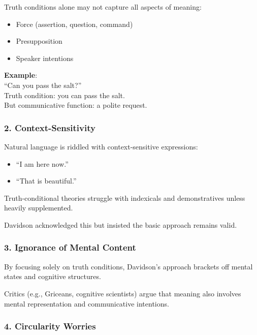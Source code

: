\documentclass[12pt]{article}
\newcommand{\tightlist}{\itemsep 0pt\parskip 0pt\parsep 0pt}
\begin{document}
Truth conditions alone may not capture all aspects of meaning:

\begin{itemize}
\tightlist
\item
  Force (assertion, question, command)
\item
  Presupposition
\item
  Speaker intentions
\end{itemize}

\textbf{Example}:\\
``Can you pass the salt?''\\
Truth condition: you can pass the salt.\\
But communicative function: a polite request.

\hypertarget{context-sensitivity}{%
\subsubsection{\texorpdfstring{2.
\textbf{Context-Sensitivity}}{2. Context-Sensitivity}}\label{context-sensitivity}}

Natural language is riddled with context-sensitive expressions:

\begin{itemize}
\tightlist
\item
  ``I am here now.''
\item
  ``That is beautiful.''
\end{itemize}

Truth-conditional theories struggle with indexicals and demonstratives
unless heavily supplemented.

Davidson acknowledged this but insisted the basic approach remains
valid.

\hypertarget{ignorance-of-mental-content}{%
\subsubsection{\texorpdfstring{3. \textbf{Ignorance of Mental
Content}}{3. Ignorance of Mental Content}}\label{ignorance-of-mental-content}}

By focusing solely on truth conditions, Davidson's approach brackets off
mental states and cognitive structures.

Critics (e.g., Griceans, cognitive scientists) argue that meaning also
involves mental representation and communicative intentions.

\hypertarget{circularity-worries}{%
\subsubsection{\texorpdfstring{4. \textbf{Circularity
Worries}}{4. Circularity Worries}}\label{circularity-worries}}
\end{document}
